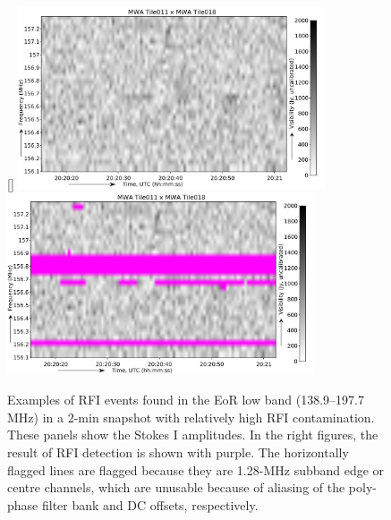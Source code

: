 \documentclass{pasa}
\begin{document}
\begin{figure}
{\label{fig:150_2}
}\\\vspace{3mm}%
[\linewidth]{%
\includegraphics[width=9.1cm]{img/156_7_mhz_example}\includegraphics[width=9.1cm]{img/156_7_mhz_flagged}
\label{fig:156_7}
}%
\caption{Examples of RFI events found in the EoR low band (138.9--197.7 MHz) in a 2-min snapshot with relatively high RFI contamination. These panels show the Stokes I amplitudes. In the right figures, the result of RFI detection is shown with purple. The horizontally flagged lines are flagged because they are 1.28-MHz subband edge or centre channels, which are unusable because of aliasing of the poly-phase filter bank and DC offsets, respectively.}
\end{figure}

\end{document}
